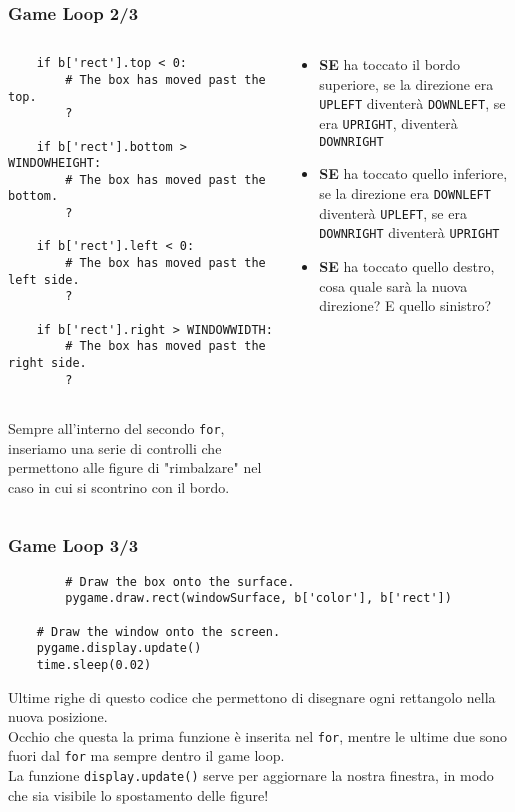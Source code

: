 \documentclass{beamer}
\begin{document}
\begin{frame}[fragile]
\frametitle{Game Loop 2/3}
\lstset{basicstyle=\tiny}
\begin{columns}
	\begin{column}[T]{0.5\textwidth}
		\begin{lstlisting}
    if b['rect'].top < 0:
        # The box has moved past the top.
        ?
		
    if b['rect'].bottom > WINDOWHEIGHT:
        # The box has moved past the bottom.
        ?
		
    if b['rect'].left < 0:
        # The box has moved past the left side.
        ?
		
    if b['rect'].right > WINDOWWIDTH:
        # The box has moved past the right side.
        ?
		
		\end{lstlisting}
		Sempre all'interno del secondo \texttt{for}, inseriamo una serie di controlli che permettono alle figure di "rimbalzare" nel caso in cui si scontrino con il bordo.\\
	\end{column}
	\begin{column}[T]{0.5\textwidth}
		
		\begin{itemize}
			\item \textbf{SE} ha toccato il bordo superiore, se la direzione era \texttt{UPLEFT} diventerà \texttt{DOWNLEFT}, se era   \texttt{UPRIGHT}, diventerà  \texttt{DOWNRIGHT}
			\item \textbf{SE} ha toccato quello inferiore, se la direzione era  \texttt{DOWNLEFT} diventerà \texttt{UPLEFT}, se era \texttt{DOWNRIGHT} diventerà \texttt{UPRIGHT}
			\item \textbf{SE} ha toccato quello destro, cosa quale sarà la nuova direzione? E quello sinistro?
		\end{itemize}
		
	\end{column}
\end{columns}
\end{frame}


\begin{frame}[fragile]
\frametitle{Game Loop 3/3}
		\begin{lstlisting}
        # Draw the box onto the surface.
        pygame.draw.rect(windowSurface, b['color'], b['rect'])
		
    # Draw the window onto the screen.
    pygame.display.update()
    time.sleep(0.02)
		\end{lstlisting}
		Ultime righe di questo codice che permettono di disegnare ogni rettangolo nella nuova posizione. \\Occhio che questa la prima funzione è inserita nel \texttt{for}, mentre le ultime due sono fuori dal \texttt{for} ma sempre dentro il game loop.\\
		La funzione \texttt{display.update()} serve per aggiornare la nostra finestra, in modo che sia visibile lo spostamento delle figure!
\end{frame}
\end{document}
